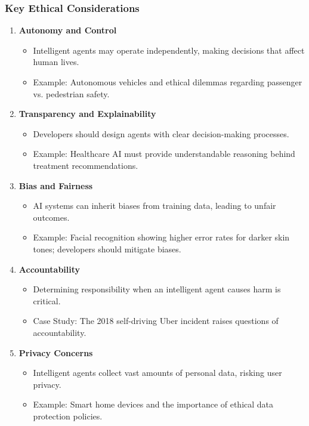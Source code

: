 \documentclass[aspectratio=169]{beamer}
\begin{document}
\begin{frame}[fragile]
  \frametitle{Key Ethical Considerations}
  
  \begin{enumerate}
    \item \textbf{Autonomy and Control}
      \begin{itemize}
        \item Intelligent agents may operate independently, making decisions that affect human lives. 
        \item Example: Autonomous vehicles and ethical dilemmas regarding passenger vs. pedestrian safety.
      \end{itemize}
      
    \item \textbf{Transparency and Explainability}
      \begin{itemize}
        \item Developers should design agents with clear decision-making processes. 
        \item Example: Healthcare AI must provide understandable reasoning behind treatment recommendations.
      \end{itemize}

    \item \textbf{Bias and Fairness}
      \begin{itemize}
        \item AI systems can inherit biases from training data, leading to unfair outcomes. 
        \item Example: Facial recognition showing higher error rates for darker skin tones; developers should mitigate biases.
      \end{itemize}
      
    \item \textbf{Accountability}
      \begin{itemize}
        \item Determining responsibility when an intelligent agent causes harm is critical. 
        \item Case Study: The 2018 self-driving Uber incident raises questions of accountability.
      \end{itemize}
      
    \item \textbf{Privacy Concerns}
      \begin{itemize}
        \item Intelligent agents collect vast amounts of personal data, risking user privacy. 
        \item Example: Smart home devices and the importance of ethical data protection policies.
      \end{itemize}
  \end{enumerate}
\end{frame}
\end{document}
